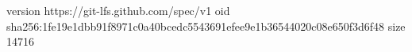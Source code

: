 version https://git-lfs.github.com/spec/v1
oid sha256:1fe19e1dbb91f8971c0a40bcedc5543691efee9e1b36544020c08e650f3d6f48
size 14716
